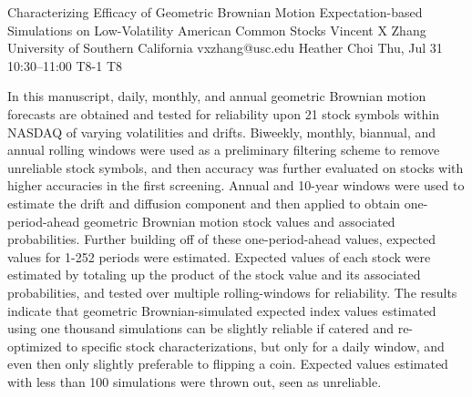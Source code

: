 \begin{talk}
  {Characterizing Efficacy of Geometric Brownian Motion Expectation-based Simulations on Low-Volatility American Common Stocks}%
  {Vincent X Zhang}%
  {University of Southern California}%
  {vxzhang@usc.edu}%
  {Heather Choi}%
  {}%
  {Thu, Jul 31 10:30--11:00}%
  {T8-1}%
  {T8}%
  
    
   
In this manuscript, daily, monthly, and annual geometric Brownian motion forecasts are obtained and tested for reliability upon 21 stock symbols within NASDAQ of varying volatilities and drifts. Biweekly, monthly, biannual, and annual rolling windows were used as a preliminary filtering scheme to remove unreliable stock symbols, and then accuracy was further evaluated on stocks with higher accuracies in the first screening. Annual and 10-year windows were used to estimate the drift and diffusion component and then applied to obtain one-period-ahead geometric Brownian motion stock values and associated probabilities. Further building off of these one-period-ahead values, expected values for 1-252 periods were estimated. Expected values of each stock were estimated by totaling up the product of the stock value and its associated probabilities, and tested over multiple rolling-windows for reliability. The results indicate that geometric Brownian-simulated expected index values estimated using one thousand simulations can be slightly reliable if catered and re-optimized to specific stock characterizations, but only for a daily window, and even then only slightly preferable to flipping a coin. Expected values estimated with less than 100 simulations were thrown out, seen as unreliable.


\medskip


\end{talk}
